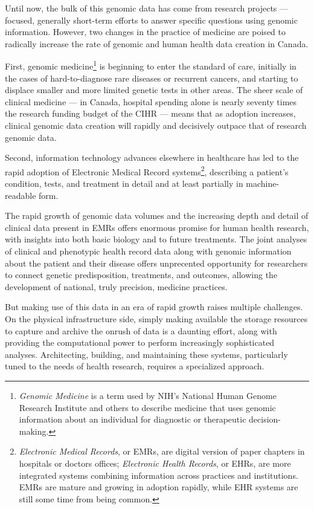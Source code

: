 \documentclass[twoside,symmetric,sfsidenotes,notoc]{tufte-book}
\begin{document}
Until now, the bulk of this genomic data has come from research projects ---
focused, generally short-term efforts to answer specific questions using 
genomic information. However, two changes in the practice of medicine are
poised to radically increase the rate of genomic and human health data creation
in Canada.

First, genomic medicine\footnote{\textit{Genomic Medicine} is a term used by NIH's
National Human Genome Research Institute and others to describe medicine 
that uses genomic information about an individual 
for diagnostic or therapeutic decision-making.} is beginning
to enter the standard of care, initially in the cases of hard-to-diagnose
rare diseases or recurrent cancers, and starting to displace smaller
and more limited genetic tests in other areas.  The sheer scale of clinical medicine 
--- in Canada, hospital spending alone is nearly seventy times the research funding
budget of the CIHR --- means that as adoption increases, clinical
genomic data creation will rapidly and decisively outpace that of research genomic data.

Second, information technology advances elsewhere in healthcare
has led to the rapid adoption of Electronic Medical Record systems\footnote{
\textit{Electronic Medical Records}, or EMRs, are digital version of paper chapters
in hospitals or doctors offices; \textit{Electronic Health Records}, or EHRs, are
more integrated systems combining information across practices and institutions.
EMRs are mature and growing in adoption rapidly, while EHR systems are still
some time from being common.}, describing a patient's condition, tests, and
treatment in detail and at least partially in machine-readable form.

The rapid growth of genomic data volumes and the increasing depth and detail
of clinical data present in EMRs offers enormous promise for human health research,
with insights into both basic biology and to future treatments.  The joint analyses
of clinical and phenotypic health record data along with genomic information 
about the patient and their disease offers unprecented opportunity for researchers
to connect genetic predisposition, treatments, and outcomes, allowing the
development of national, truly precision, medicine practices.

But making use of this data in an era of rapid growth raises multiple challenges.
On the physical infrastructure side, simply making available the storage 
resources to capture and archive the onrush of data is a daunting effort, along with
providing the computational power to perform increasingly sophisticated analyses.
Architecting, building, and maintaining these systems, particularly tuned to
the needs of health research, requires a specialized approach.
\end{document}
